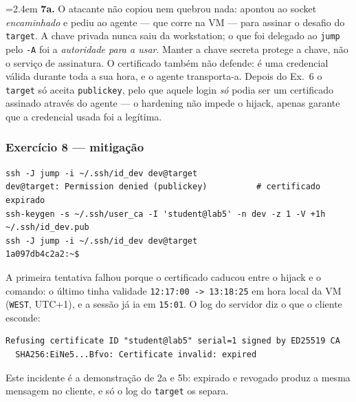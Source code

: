 \documentclass[a4paper,11pt]{article}
\newenvironment{answer}[1]{%
  \par\addvspace{7pt}\noindent
  \hangindent=2.4em\hangafter=1
  {\color{sscnblue}\bfseries #1\hspace{0.55em}}\ignorespaces}
  {\par\addvspace{5pt}}
\newcommand{\cmd}[1]{\textcolor{sscnblue}{\texttt{#1}}}
\newcommand{\file}[1]{\texttt{\detokenize{#1}}}
\begin{document}
\begin{answer}{7a.}
O atacante n\~ao copiou nem quebrou nada: apontou \file{SSH_AUTH_SOCK} ao socket
\emph{encaminhado} e pediu ao agente --- que corre na VM --- para assinar o desafio do
\cmd{target}. A chave privada nunca saiu da workstation; o que foi delegado ao \cmd{jump}
pelo \cmd{-A} foi a \emph{autoridade para a usar}. Manter a chave secreta protege a chave,
n\~ao o servi\c{c}o de assinatura. O certificado tamb\'em n\~ao defende: \'e uma credencial
v\'alida durante toda a sua hora, e o agente transporta-a. Depois do Ex.\ 6 o \cmd{target}
s\'o aceita \cmd{publickey}, pelo que aquele login \emph{s\'o} podia ser um certificado
assinado atrav\'es do agente --- o hardening n\~ao impede o hijack, apenas garante que a
credencial usada foi a leg\'itima.
\end{answer}

\subsubsection{Exerc\'icio 8 --- mitiga\c{c}\~ao}

\begin{lstlisting}
ssh -J jump -i ~/.ssh/id_dev dev@target
dev@target: Permission denied (publickey)          # certificado expirado
ssh-keygen -s ~/.ssh/user_ca -I 'student@lab5' -n dev -z 1 -V +1h ~/.ssh/id_dev.pub
ssh -J jump -i ~/.ssh/id_dev dev@target
1a097db4c2a2:~$
\end{lstlisting}

A primeira tentativa falhou porque o certificado caducou entre o hijack e o comando: o
\'ultimo tinha validade \cmd{12:17:00 -> 13:18:25} em hora local da VM (\cmd{WEST},
UTC+1), e a sess\~ao j\'a ia em \cmd{15:01}. O log do servidor diz o que o cliente esconde:

\begin{lstlisting}
Refusing certificate ID "student@lab5" serial=1 signed by ED25519 CA
  SHA256:EiNe5...Bfvo: Certificate invalid: expired
\end{lstlisting}

Este incidente \'e a demonstra\c{c}\~ao de 2a e 5b: expirado e revogado produz a mesma
mensagem no cliente, e s\'o o log do \cmd{target} os separa.
\end{document}
